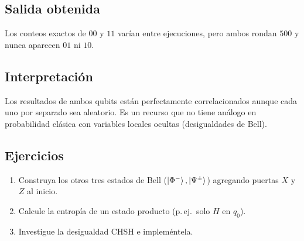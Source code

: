 \subsection{Salida obtenida}

Los conteos exactos de $00$ y $11$ varían entre ejecuciones, pero ambos rondan
$500$ y nunca aparecen $01$ ni $10$.

\subsection{Interpretación}
Los resultados de ambos qubits están perfectamente correlacionados aunque cada
uno por separado sea aleatorio. Es un recurso que no tiene análogo en
probabilidad clásica con variables locales ocultas (desigualdades de Bell).

\subsection{Ejercicios}
\begin{enumerate}
  \item Construya los otros tres estados de Bell
    ($\left|\Phi^-\right\rangle,\left|\Psi^\pm\right\rangle$) agregando puertas $X$ y $Z$ al inicio.
  \item Calcule la entropía de un estado producto (p.\,ej.\ solo $H$ en $q_0$).
  \item Investigue la desigualdad CHSH e impleméntela.
\end{enumerate}


